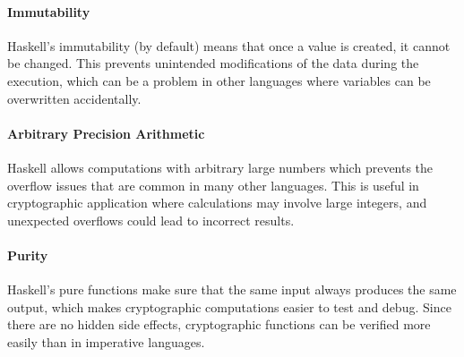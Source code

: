 \paragraph{Immutability}
Haskell's immutability (by default) means that once a value is created, it cannot be changed. 
This prevents unintended modifications of the data during the execution, which can be a problem in other languages where variables can be overwritten accidentally.

\paragraph{Arbitrary Precision Arithmetic}
Haskell allows computations with arbitrary large numbers which prevents the overflow issues that are common in many other languages.
This is useful in cryptographic application where calculations may involve large integers, and unexpected overflows could lead to incorrect results.

\paragraph{Purity}
Haskell's pure functions make sure that the same input always produces the same output, which makes cryptographic computations easier to test and debug. 
Since there are no hidden side effects, cryptographic functions can be verified more easily than in imperative languages.

